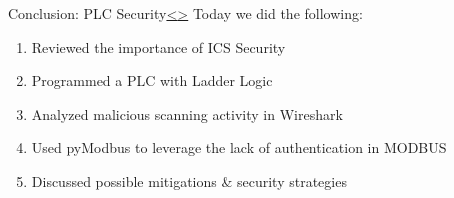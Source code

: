 \documentclass[12pt]{extarticle}
\newenvironment{instructionblock}{\Large\bgroup}{\egroup}
\newcommand{\ben}{\begin{enumerate}}
\newcommand{\een}{\end{enumerate}}
\newcounter{next}
\newcounter{prev}
\begin{document}
\pagebreak
{}
\begin{slide}{Conclusion: PLC Security}{\hyperref[slide \theprev]{\textless}\hyperref[slide \thenext]{\textgreater}}
	\begin{instructionblock}
		Today we did the following:
		\ben
		\item Reviewed the importance of ICS Security
		\item Programmed a PLC with Ladder Logic
		\item Analyzed malicious scanning activity in Wireshark
		\item Used pyModbus to leverage the lack of authentication in MODBUS
		\item Discussed possible mitigations \& security strategies
		\een
	\end{instructionblock}
\end{slide}
\end{document}

